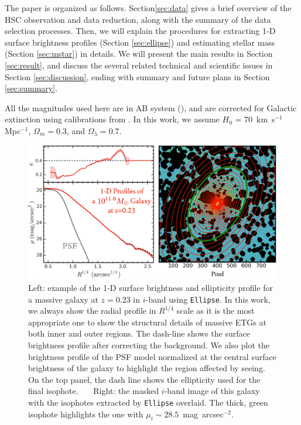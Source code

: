 \documentclass{emulateapj}
\def\sb{mag~arcsec$^{-2}$}
\begin{document}
\begin{CJK*}{UTF8}{gbsn}
    The paper is organized as follows. Section\ref{sec:data} gives a brief overview of 
    the HSC observation and data reduction, along with the summary of the data selection
    processes.  
    Then, we will explain the procedures for extracting 1-D surface brightness profiles 
    (Section \ref{sec:ellipse}) and estimating stellar mass (Section \ref{sec:mstar}) in
    details.   
    We will present the main results in Section \ref{sec:result}, and discuss the several 
    related technical and scientific issues in Section \ref{sec:discussion}, ending with
    summary and future plans in Section \ref{sec:summary}.

    All the magnitudes used here are in AB system (\citealt{Oke1983}), and are corrected 
    for Galactic extinction using calibrations from \citet{Schlafly11}.
    In this work, we assume $H_0$ = 70~km~s$^{-1}$ Mpc$^{-1}$, ${\Omega}_m=0.3$, 
    and ${\Omega}_{\lambda}=0.7$. 
    

    \begin{figure}[bt]
        \centering 
        \includegraphics[width=\textwidth]{fig/redbcg_ellipse_example}
        \caption{Left: example of the 1-D surface brightness and ellipticity profile 
            for a massive galaxy at $z=0.23$ in $i$-band using \texttt{Ellipse}. 
            In this work, we always show the radial profile in $R^{1/4}$ scale as it 
            is the most appropriate one to show the structural details of massive 
            ETGs at both inner and outer regions. 
            The dash-line shows the surface brightness profile after correcting the 
            background. 
            We also plot the brightness profile of the PSF model normalized at the 
            central surface brightness of the galaxy to highlight the region affected 
            by seeing. 
            On the top panel, the dash line shows the ellipticity used for the final 
            isophote.~~~ 
            Right: the masked $i$-band image of this galaxy with the isophotes extracted 
            by \texttt{Ellipse} overlaid. 
            The thick, green isophote highlights the one with $\mu_{i}\sim 28.5$~\sb.}
        \label{fig:ellipse}
    \end{figure}


\end{CJK*}
\end{document}

